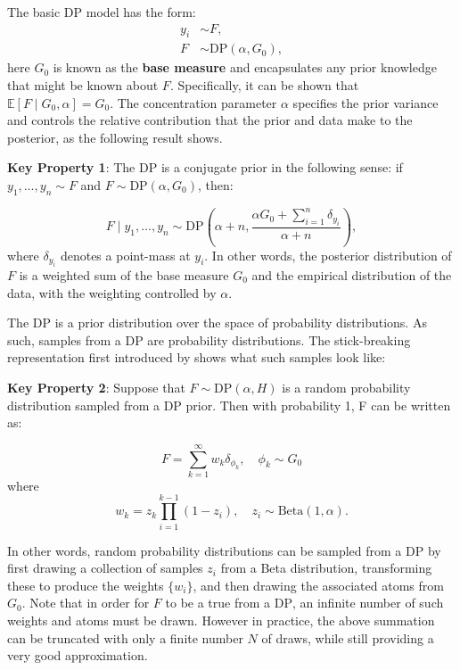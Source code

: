 \documentclass[nojss]{jss}
\begin{document}
The basic DP model has the form:
\begin{align*}
y_i & \sim F, \\
F & \sim \text{DP} (\alpha, G_0),
\end{align*}
here $G_0$ is known as the \textbf{base measure} and encapsulates any prior knowledge that might be known about $F$.  Specifically, it can be shown that $\mathbb{E}[F \mid G_0,\alpha] = G_0$. The concentration parameter $\alpha$ specifies the prior variance and controls the relative contribution that the prior and data make to the posterior, as the following result shows.

\begin{tcolorbox}

\textbf{Key Property 1}: The DP is a conjugate prior in the following sense: if $y_1,\ldots,y_n \sim F$ and $F \sim \text{DP} (\alpha, G_0)$, then:

$$F \mid y_1,\ldots,y_n \sim \text{DP} \left( \alpha + n, \frac{\alpha G_0 + \sum_{i=1}^n \delta_{y_i}}{\alpha+n}\right),$$
where $\delta_{y_i}$ denotes a point-mass at $y_i$. In other words, the posterior distribution of $F$ is a weighted sum of the base measure $G_0$ and the empirical distribution of the data, with the weighting controlled by $\alpha$.

\end{tcolorbox}

The DP is a prior distribution over the space of probability distributions. As such, samples from a DP are probability distributions. The stick-breaking representation first introduced by \cite{sethuraman_constructive_1994} shows what such samples look like:

\begin{tcolorbox}

\textbf{Key Property 2}:
Suppose that $F \sim \text{DP} (\alpha, H)$ is a random probability distribution sampled from a DP prior. Then with probability 1, F can be written as:

$$F = \sum_{k=1}^\infty w_k \delta_{\phi_k}, \quad \phi_k \sim G_0$$
where
$$w_k = z_k \prod_{i=1}^{k-1} (1-z_i),\quad z_i \sim \text{Beta}(1,\alpha).$$

\end{tcolorbox}

In other words, random probability distributions can be sampled from a DP by first drawing a collection of samples ${z_i}$ from a Beta distribution, transforming these to produce the weights $\{w_i\}$, and then drawing the associated atoms from $G_0$. Note that in order for $F$ to be a true from a $\text{DP}$, an infinite number of such weights and atoms must be drawn. However in practice, the above summation can be truncated with only a finite number $N$ of draws, while still providing a very good approximation.
\end{document}
